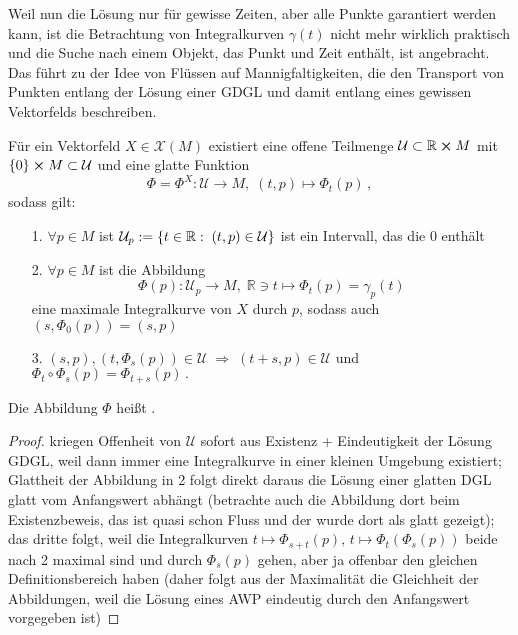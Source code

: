 \documentclass[../H_Analysis_main.tex]{subfiles}
\begin{document}
Weil nun die Lösung nur für gewisse Zeiten, aber alle Punkte garantiert werden kann, ist die Betrachtung von Integralkurven $\gamma(t)$ nicht mehr wirklich praktisch und die Suche nach einem Objekt, das Punkt und Zeit enthält, ist angebracht. Das führt zu der Idee von Flüssen auf Mannigfaltigkeiten, die den Transport von Punkten entlang der Lösung einer GDGL und damit entlang eines gewissen Vektorfelds beschreiben.


\begin{satz}
Für ein Vektorfeld $X \in \mathcal{X}(M)$ existiert eine offene Teilmenge $\mathcal{U} \subset \mathbb{R} \cross M$ mit $\qty{0} \cross M \subset \mathcal{U}$ und eine glatte Funktion
\begin{equation}
\Phi = \Phi^X: \mathcal{U} \rightarrow M, \; (t, p) \mapsto \Phi_t(p) \, ,
\end{equation}
sodass gilt: %
\begin{itemize}
\item[1.] $\forall p \in M$ ist $\mathcal{U}_p := \qty{t \in \mathbb{R}: \; (t, p) \in \mathcal{U}}$ ist ein Intervall, das die 0 enthält

\item[2.] $\forall p \in M$ ist die Abbildung
\begin{equation}
\Phi(p): \mathcal{U}_p \rightarrow M, \; \mathbb{R} \ni t \mapsto \Phi_t(p) = \gamma_p(t)
\end{equation}
eine maximale Integralkurve von $X$ durch $p$, sodass auch $(s, \Phi_0(p)) = (s, p)$

\item[3.]
$%
(s, p), (t, \Phi_s(p)) \in \mathcal{U} \; \Rightarrow \; (t + s, p) \in \mathcal{U}$ und $\Phi_t \circ \Phi_s(p) = \Phi_{t + s}(p) \, .
$%
\end{itemize}

Die Abbildung $\Phi$ heißt .
\end{satz}
\begin{proof}
kriegen Offenheit von $\mathcal{U}$ sofort aus Existenz + Eindeutigkeit der Lösung GDGL, weil dann immer eine Integralkurve in einer kleinen Umgebung existiert; Glattheit der Abbildung in 2 folgt direkt daraus die Lösung einer glatten DGL glatt vom Anfangswert abhängt (betrachte auch die Abbildung dort beim Existenzbeweis, das ist quasi schon Fluss und der wurde dort als glatt gezeigt); das dritte folgt, weil die Integralkurven $t \mapsto \Phi_{s + t}(p), \, t \mapsto \Phi_t(\Phi_s(p))$ beide nach 2 maximal sind und durch $\Phi_s(p)$ gehen, aber ja offenbar den gleichen Definitionsbereich haben (daher folgt aus der Maximalität die Gleichheit der Abbildungen, weil die Lösung eines AWP eindeutig durch den Anfangswert vorgegeben ist)
\end{proof}
\end{document}
